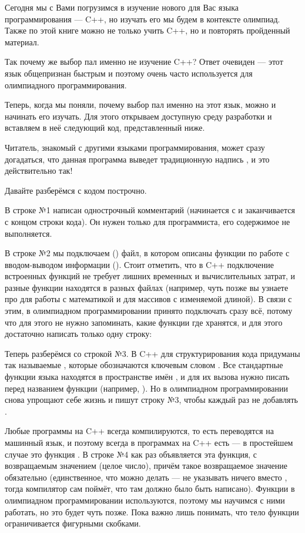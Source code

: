 \hypertarget{1.1}{}
Сегодня мы с Вами погрузимся в изучение нового для Вас языка программирования — C++, но изучать его мы будем в контексте олимпиад. Также по этой книге можно не только учить C++, но и повторять пройденный материал.

Так почему же выбор пал именно не изучение C++? Ответ очевиден — этот язык общепризнан быстрым и поэтому очень часто используется для олимпиадного программирования.

Теперь, когда мы поняли, почему выбор пал именно на этот язык, можно и начинать его изучать. Для этого открываем доступную среду разработки и вставляем в неё следующий код, представленный ниже.


Читатель, знакомый с другими языками программирования, может сразу догадаться, что данная программа выведет традиционную надпись , и это действительно так!

Давайте разберёмся с кодом построчно.

В строке №1 написан однострочный комментарий (начинается с \lcpp{//} и заканчивается с концом строки кода). Он нужен только для программиста, его содержимое не выполняется.

В строке №2 мы подключаем () файл, в котором описаны функции по работе с вводом-выводом информации (). Стоит отметить, что в C++ подключение встроенных функций не требует лишних временных и вычислительных затрат, и разные функции находятся в разных файлах (например, чуть позже вы узнаете про  для работы с математикой и  для массивов с изменяемой длиной). В связи с этим, в олимпиадном программировании принято подключать сразу всё, потому что для этого не нужно запоминать, какие функции где хранятся, и для этого достаточно написать только одну строку:


Теперь разберёмся со строкой №3. В C++ для структурирования кода придуманы так называемые , которые обозначаются ключевым словом . Все стандартные функции языка находятся в пространстве имён , и для их вызова нужно писать  перед названием функции (например, ). Но в олимпиадном программировании снова упрощают себе жизнь и пишут строку №3, чтобы каждый раз не добавлять .

Любые программы на C++ всегда компилируются, то есть переводятся на машинный язык, и поэтому всегда в программах на C++ есть  —  в простейшем случае это функция . В строке №4 как раз объявляется эта функция, с возвращаемым значением  (целое число), причём такое возвращаемое значение обязательно (единственное, что можно делать — не указывать ничего вместо , тогда компилятор сам поймёт, что там должно было быть написано). Функции в олимпиадном программировании используются, поэтому мы научимся с ними работать, но это будет чуть позже. Пока важно лишь понимать, что тело функции ограничивается фигурными скобками.

